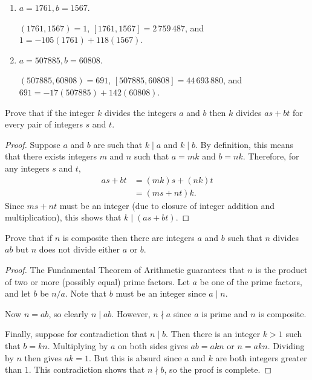 \begin{enumerate}
\item
  $a = 1761, b = 1567$.
  \begin{solution}
    $(1761, 1567) = 1$, $[1761, 1567] = 2\,759\,487$, and
    $1 = -105(1761) + 118(1567)$.
  \end{solution}

\item
  $a = 507885, b = 60808$.
  \begin{solution}
    $(507885, 60808) = 691$, $[507885, 60808] = 44\,693\,880$, and
    $691 = -17(507885) + 142(60808)$.
  \end{solution}

\end{enumerate}

 Prove that if the integer $k$ divides the integers $a$
and $b$ then $k$ divides $as + bt$ for every pair of integers $s$ and
$t$.
\begin{proof}
  Suppose $a$ and $b$ are such that $k\mid a$ and $k\mid b$. By
  definition, this means that there exists integers $m$ and $n$ such
  that $a = mk$ and $b = nk$. Therefore, for any integers $s$ and $t$,
  \begin{align*}
    as + bt &= (mk)s + (nk)t \\
            &= (ms + nt)k.
  \end{align*}
  Since $ms + nt$ must be an integer (due to closure of integer
  addition and multiplication), this shows that $k\mid(as + bt)$.
\end{proof}

 Prove that if $n$ is composite then there are integers
$a$ and $b$ such that $n$ divides $ab$ but $n$ does not divide either
$a$ or $b$.
\begin{proof}
  The Fundamental Theorem of Arithmetic guarantees that $n$ is the
  product of two or more (possibly equal) prime factors. Let $a$ be
  one of the prime factors, and let $b$ be $n / a$. Note that $b$ must
  be an integer since $a\mid n$.

  Now $n = ab$, so clearly $n \mid ab$. However, $n \nmid a$ since $a$
  is prime and $n$ is composite.

  Finally, suppose for contradiction that $n\mid b$. Then there is an
  integer $k > 1$ such that $b = kn$. Multiplying by $a$ on both sides
  gives $ab = akn$ or $n = akn$. Dividing by $n$ then gives $ak =
  1$. But this is absurd since $a$ and $k$ are both integers greater
  than $1$. This contradiction shows that $n\nmid b$, so the proof is
  complete.
\end{proof}

